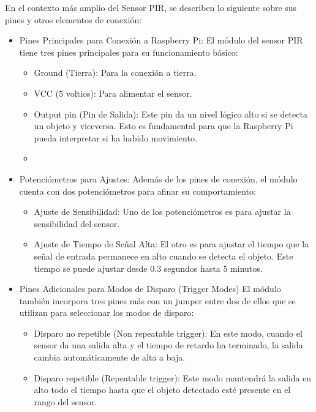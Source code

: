 \documentclass{report}
\begin{document}
En el contexto más amplio del Sensor PIR, se  describen lo siguiente sobre sus pines y otros elementos de conexión:
\begin{itemize}
    \item Pines Principales para Conexión a Raspberry Pi: El módulo del sensor PIR tiene tres pines principales para su funcionamiento básico:
    \begin{itemize}
        \item Ground (Tierra): Para la conexión a tierra.
        \item VCC (5 voltios): Para alimentar el sensor.
        \item Output pin (Pin de Salida): Este pin da un nivel lógico alto si se detecta un objeto y viceversa. Esto es fundamental para que la Raspberry 
        Pi pueda interpretar si ha habido movimiento.
        \item  
    \end{itemize}
    \item Potenciómetros para Ajustes: Además de los pines de conexión, el módulo cuenta con dos potenciómetros para afinar su comportamiento:
    \begin{itemize}
        \item Ajuste de Sensibilidad: Uno de los potenciómetros es para ajustar la sensibilidad del sensor.
        \item Ajuste de Tiempo de Señal Alta: El otro es para ajustar el tiempo que la señal de entrada permanece en alto cuando se detecta el objeto. 
        Este tiempo se puede ajustar desde 0.3 segundos hasta 5 minutos.
    \end{itemize}
    \item Pines Adicionales para Modos de Disparo (Trigger Modes) El módulo también incorpora tres pines más con un jumper entre dos de ellos que se 
    utilizan para seleccionar los modos de disparo:
    \begin{itemize}
        \item Disparo no repetible (Non repeatable trigger): En este modo, cuando el sensor da una salida alta y el tiempo de retardo ha terminado, 
        la salida cambia automáticamente de alta a baja.
        \item Disparo repetible (Repeatable trigger): Este modo mantendrá la salida en alto todo el tiempo hasta que el objeto detectado esté presente 
        en el rango del sensor.
    \end{itemize}
\end{itemize}
\end{document}
